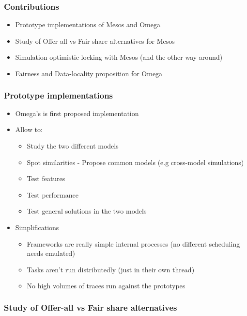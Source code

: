 \documentclass{beamer}
\begin{document}
  \begin{frame}
    \frametitle{Contributions}
    \begin{itemize}
        \item Prototype implementations of Mesos and Omega
        \item Study of Offer-all vs Fair share alternatives for Mesos
        \item Simulation optimistic locking with Mesos (and the other way around)
        \item Fairness and Data-locality proposition for Omega
    \end{itemize}
  \end{frame}

  \begin{frame}
    \frametitle{Prototype implementations}
    \begin{itemize}
        \item Omega's is first proposed implementation
        \item Allow to:
        \begin{itemize}
          \item Study the two different models
          \item Spot similarities - Propose common models (e.g
            cross-model simulations)
          \item Test features
          \item Test performance
          \item Test general solutions in the two models 
        \end{itemize}
        \item Simplifications
          \begin{itemize}
            \item Frameworks are really simple internal processes (no
              different scheduling needs emulated)
            \item Tasks aren't run distributedly (just in their own thread)
            \item No high volumes of traces run against the prototypes
          \end{itemize}
    \end{itemize}
  \end{frame}

    \begin{frame}
      \frametitle{Study of Offer-all vs Fair share alternatives}
      \begin{itemize}
      \end{itemize}
    \end{frame}
\end{document}
